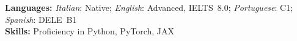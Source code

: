 

\noindent\textbf{Languages:} \textit{Italian}: Native; \textit{English}: Advanced, IELTS~8.0; \textit{Portuguese}: C1; \textit{Spanish}: DELE~B1\\
\noindent\textbf{Skills:} Proficiency in Python, PyTorch, JAX


